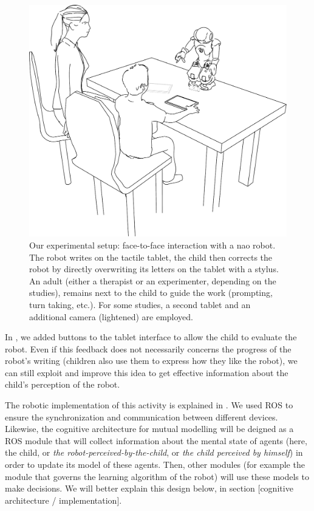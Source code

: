 \documentclass[10pt,a4paper]{article}
\begin{document}
   \begin{figure}
       \centering
       \includegraphics[width=0.6\columnwidth]{experimental_setup}
       \caption{\small Our experimental setup: face-to-face interaction with a {\sc
           nao} robot.  The robot writes on the tactile tablet, the child then
           corrects the robot by directly overwriting its letters on the tablet
           with a stylus. An adult (either a therapist or an experimenter,
           depending on the studies), remains next to the child to guide the work
           (prompting, turn taking, etc.). For some studies, a second tablet and an
           additional camera (lightened) are employed.}

       \label{experimental_setup}
   \end{figure}
   
In \cite{jacq2016building}, we added buttons to the tablet interface to allow the child to evaluate the robot. Even if this feedback does not necessarily concerns the progress of the robot's writing (children also use them to express how they like the robot), we can still exploit and improve this idea to get effective information about the child's perception of the robot.
   
The robotic implementation of this activity is explained in \cite{Hood}. We used ROS to ensure the synchronization and communication between different devices. Likewise, the cognitive architecture for mutual modelling will be deigned as a ROS module that will collect information about the mental state of agents (here, the child, or \textit{the robot-perceived-by-the-child}, or \textit{the child perceived by himself}) in order to update its model of these agents. Then, other modules (for example the module that governs the learning algorithm of the robot) will use these models to make decisions. We will better explain this design below, in section [cognitive architecture / implementation].
\end{document}
